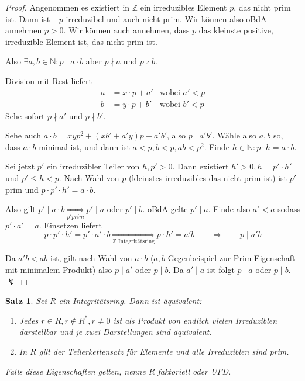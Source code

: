 \documentclass[a4paper,12pt,numbers=noenddot,parskip=full]{scrartcl}
\newcommand{\setN}{\mathbb{N}}
\newcommand{\setZ}{\mathbb{Z}}
\theoremstyle{dotless}
\newtheorem{theorem}{Satz}[section]
\theoremstyle{remark}
\begin{document}
	\begin{proof}
		Angenommen es existiert in $\setZ$ ein irreduzibles Element $p$, das nicht prim ist. Dann ist $-p$ irreduzibel und auch nicht prim. Wir können also oBdA annehmen $p > 0$. Wir können auch annehmen, dass $p$ das kleinste positive, irreduzible Element ist, das nicht prim ist.
		
		Also $\exists a,b \in \setN: p \mid a \cdot b$ aber $p \nmid a$ und $p \nmid b$.
		
		Division mit Rest liefert
		\begin{align*}
		 	a &= x \cdot p + a' & \text{wobei $a' < p$}\\
		 	b &= y \cdot p + b' & \text{wobei $b' < p$}
		\end{align*}
		Sehe sofort $p \nmid a'$ und $p \nmid b'$.
		
		Sehe auch $a \cdot b = x y p^2 + (x b' + a' y) p + a'b'$, also $p \mid a' b'$.
		Wähle also $a,b$ so, dass $a \cdot b$ minimal ist, und dann ist $a < p, b < p, ab < p^2$.
		Finde $h \in \setN: p \cdot h = a \cdot b$.
		
		Sei jetzt $p'$ ein irreduzibler Teiler von $h, p' > 0$. Dann existiert $h' > 0, h = p' \cdot h'$ und $p' \leq h < p$. Nach Wahl von $p$ (kleinstes irreduzibles das nicht prim ist) ist $p'$ prim und $p \cdot p' \cdot h' = a \cdot b$.
		
		Also gilt $p' \mid a \cdot b \underset{\text{$p' prim$}}{\Rightarrow} p' \mid a$ oder $p' \mid b$. oBdA gelte $p' \mid a$. Finde also $a' < a$ sodass $p' \cdot a' = a$. Einsetzen liefert 
		\begin{equation*}
			p \cdot p' \cdot h' = p' \cdot a' \cdot b \underset{\text{$\setZ$ Integritätsring}}{\Longrightarrow} p \cdot h' = a' b \qquad\Longrightarrow\qquad p \mid a' b
		\end{equation*}
		
		Da $a' b < ab$ ist, gilt nach Wahl von $a \cdot b$ ($a,b$ Gegenbeispiel zur Prim-Eigenschaft mit minimalem Produkt) also $p \mid a'$ oder $p \mid b$. Da $a' \mid a$ ist folgt $p \mid a$ oder $p \mid b$. $\lightning$
	\end{proof}

	\begin{theorem}
		Sei $R$ ein Integritätsring. Dann ist äquivalent:
		\begin{enumerate}
			\item Jedes $r \in R, r \notin R^*, r \neq 0$ ist als \emph{Produkt von endlich vielen Irreduziblen} darstellbar und je \emph{zwei Darstellungen} sind \emph{äquivalent}.
			\item In $R$ gilt der \emph{Teilerkettensatz} für Elemente und alle \emph{Irreduziblen sind prim}.
		\end{enumerate}
		Falls diese Eigenschaften gelten, nenne $R$ faktoriell oder UFD.
	\end{theorem}
\end{document}
